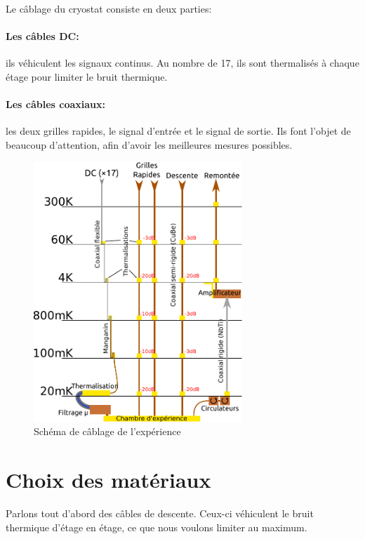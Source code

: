 \vspace*{-0.5cm}
Le câblage du cryostat consiste en deux parties: 
\paragraph*{Les câbles DC: }ils véhiculent les signaux continus. Au nombre de 17, ils sont thermalisés à chaque étage pour limiter le bruit thermique.
\paragraph*{Les câbles coaxiaux: }les deux grilles rapides, le signal d'entrée et le signal de sortie. Ils font l'objet de beaucoup d'attention, afin d'avoir les meilleures mesures possibles.

\vspace*{0.2cm}
\begin{figure}[h]
    \begin{center}
        \includegraphics[width=0.7\textwidth]{Images/Cablage_schema}
        \caption{Schéma de câblage de l'expérience}
        \label{cablage_schema}
    \end{center}
\end{figure}




\section{Choix des matériaux}
Parlons tout d'abord des câbles de descente. Ceux-ci véhiculent le bruit thermique d'étage en étage, ce que nous voulons limiter au maximum.

